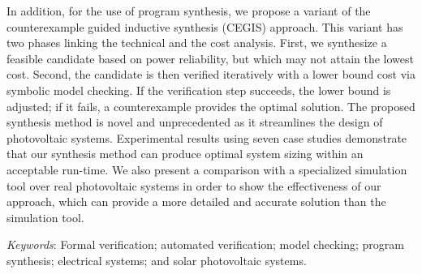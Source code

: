 In addition, for the use of program synthesis, we propose a variant of the counterexample guided inductive synthesis (CEGIS) approach. This variant has two phases linking the technical and the cost analysis. First, we synthesize a feasible candidate based on power reliability, but which may not attain the lowest cost. Second, the candidate is then verified iteratively with a lower bound cost via symbolic model checking. If the verification step succeeds, the lower bound is adjusted; if it fails, a counterexample provides the optimal solution. The proposed synthesis method is novel and unprecedented as it streamlines the design of photovoltaic systems. Experimental results using seven case studies demonstrate that our synthesis method can produce optimal system sizing within an acceptable run-time. We also present a comparison with a specialized simulation tool over real photovoltaic systems in order to show the effectiveness of our approach, which can provide a more detailed and accurate solution than the simulation tool.

\textit{Keywords}: Formal verification; automated verification; model checking; program synthesis; electrical systems; and solar photovoltaic systems.
